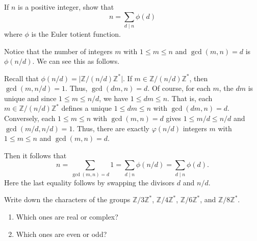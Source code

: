 \documentclass[12 pt, letterpaper]{hmcpset}
\begin{document}
\pagebreak

\begin{problem}[S \& S \S 8.4 \#5]
	If $n$ is a positive integer, show that
	\[
		n = \sum_{d \mid n} \phi(d)
	\]
	where $\phi$ is the Euler totient function.
\end{problem}

\begin{solution}
	Notice that the number of integers $m$ with $1 \le m \le n$ and $\gcd(m, n) = d$ is $\phi(n / d)$. We can see this as follows. 

	Recall that $\phi(n / d) = \lvert \mathbb{Z} / (n / d) \mathbb{Z}^{*} \rvert$. If $m \in \mathbb{Z} / (n / d) \mathbb{Z}^{*}$, then $\gcd(m, n / d) = 1$. Thus, $\gcd(d m, n) = d$. Of course, for each $m$, the $d m$ is unique and since $1 \le m \le n / d$, we have  $1 \le d m \le n$. That is, each $m \in \mathbb{Z} / (n / d) \mathbb{Z}^{*}$ defines a unique $1 \le d m \le n$ with $\gcd(d m, n) = d$. Conversely, each $1 \le m \le n$ with $\gcd (m, n) = d$ gives $1 \le m / d \le n / d$ and $\gcd(m / d, n / d) = 1$. Thus, there are exactly $\varphi(n / d)$ integers $m$ with $1 \le m \le n$ and $\gcd(m, n) = d$.

	Then it follows that
	\[
		n = \sum_{\gcd(m, n) = d} 1 = \sum_{d \mid n} \phi(n / d) = \sum_{d \mid n} \phi(d).
	\]
	Here the last equality follows by swapping the divisors $d$ and $n / d$.
\end{solution}

\pagebreak

\begin{problem}[S \& S \S 8.4 \#6]
	Write down the characters of the groups $\mathbb{Z} / 3 \mathbb{Z}^{*}$, $\mathbb{Z} / 4 \mathbb{Z}^{*}$, $\mathbb{Z} / 6 \mathbb{Z}^{*}$, and $\mathbb{Z} / 8 \mathbb{Z}^{*}$.
	\begin{enumerate}
		\item Which ones are real or complex?
		\item Which ones are even or odd?
	\end{enumerate}
\end{problem}
\end{document}
